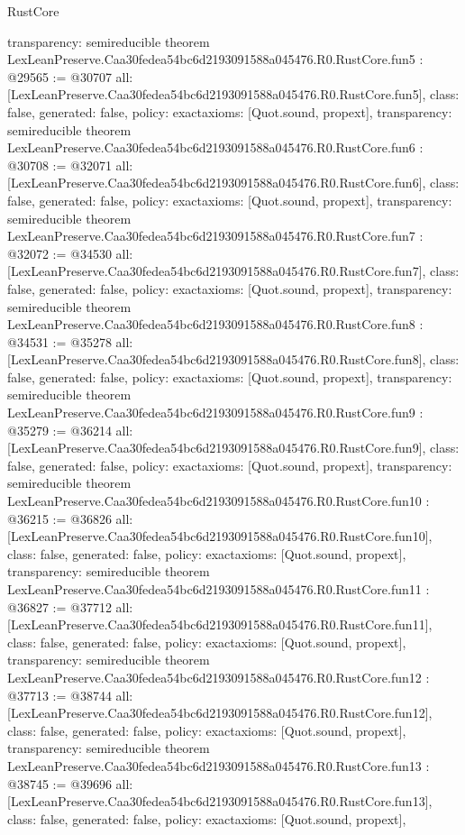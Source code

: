 \begin{lexlean}{RustCore}
\begin{coremodule}
{  transparency: semireducible
}
theorem LexLeanPreserve.Caa30fedea54bc6d2193091588a045476.R0.RustCore.fun5 : @29565 := @30707 {
  all: [LexLeanPreserve.Caa30fedea54bc6d2193091588a045476.R0.RustCore.fun5],
  class: false,
  generated: false,
  policy: exact{axioms: [Quot.sound, propext]},
  transparency: semireducible
}
theorem LexLeanPreserve.Caa30fedea54bc6d2193091588a045476.R0.RustCore.fun6 : @30708 := @32071 {
  all: [LexLeanPreserve.Caa30fedea54bc6d2193091588a045476.R0.RustCore.fun6],
  class: false,
  generated: false,
  policy: exact{axioms: [Quot.sound, propext]},
  transparency: semireducible
}
theorem LexLeanPreserve.Caa30fedea54bc6d2193091588a045476.R0.RustCore.fun7 : @32072 := @34530 {
  all: [LexLeanPreserve.Caa30fedea54bc6d2193091588a045476.R0.RustCore.fun7],
  class: false,
  generated: false,
  policy: exact{axioms: [Quot.sound, propext]},
  transparency: semireducible
}
theorem LexLeanPreserve.Caa30fedea54bc6d2193091588a045476.R0.RustCore.fun8 : @34531 := @35278 {
  all: [LexLeanPreserve.Caa30fedea54bc6d2193091588a045476.R0.RustCore.fun8],
  class: false,
  generated: false,
  policy: exact{axioms: [Quot.sound, propext]},
  transparency: semireducible
}
theorem LexLeanPreserve.Caa30fedea54bc6d2193091588a045476.R0.RustCore.fun9 : @35279 := @36214 {
  all: [LexLeanPreserve.Caa30fedea54bc6d2193091588a045476.R0.RustCore.fun9],
  class: false,
  generated: false,
  policy: exact{axioms: [Quot.sound, propext]},
  transparency: semireducible
}
theorem LexLeanPreserve.Caa30fedea54bc6d2193091588a045476.R0.RustCore.fun10 : @36215 := @36826 {
  all: [LexLeanPreserve.Caa30fedea54bc6d2193091588a045476.R0.RustCore.fun10],
  class: false,
  generated: false,
  policy: exact{axioms: [Quot.sound, propext]},
  transparency: semireducible
}
theorem LexLeanPreserve.Caa30fedea54bc6d2193091588a045476.R0.RustCore.fun11 : @36827 := @37712 {
  all: [LexLeanPreserve.Caa30fedea54bc6d2193091588a045476.R0.RustCore.fun11],
  class: false,
  generated: false,
  policy: exact{axioms: [Quot.sound, propext]},
  transparency: semireducible
}
theorem LexLeanPreserve.Caa30fedea54bc6d2193091588a045476.R0.RustCore.fun12 : @37713 := @38744 {
  all: [LexLeanPreserve.Caa30fedea54bc6d2193091588a045476.R0.RustCore.fun12],
  class: false,
  generated: false,
  policy: exact{axioms: [Quot.sound, propext]},
  transparency: semireducible
}
theorem LexLeanPreserve.Caa30fedea54bc6d2193091588a045476.R0.RustCore.fun13 : @38745 := @39696 {
  all: [LexLeanPreserve.Caa30fedea54bc6d2193091588a045476.R0.RustCore.fun13],
  class: false,
  generated: false,
  policy: exact{axioms: [Quot.sound, propext]},
}
\end{coremodule}
\end{lexlean}
